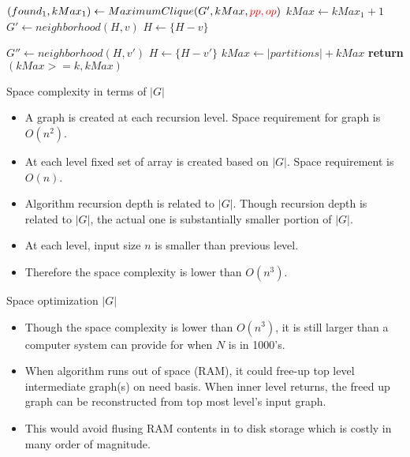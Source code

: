 \documentclass[landscape]{slides}
\begin{document}
\begin{algorithm}
	\begin{algorithmic}[1]
		\State $(found_1, kMax_1) \gets MaximumClique(G', kMax, {\color{red} pp, op})$
		\State $kMax \gets kMax_1 + 1$
		\EndIf
		\EndIf
		\EndIf
		\State
		\State $G' \gets neighborhood(H, v)$
		\State $H \gets \{H - v\}$
		
		\State $G'' \gets neighborhood(H, v')$
		\State $H \gets \{H - v'\}$
		\EndIf
		\EndFor
		\EndWhile
		\State $kMax \gets |partitions| + kMax$
		\State \textbf{return} $(kMax >= k, kMax)$
	\EndFunction
	\end{algorithmic}
\end{algorithm}

\clearpage


\begin{slide}
	\begin{center}
		Space complexity in terms of $|G|$
	\end{center}
	\begin{itemize}
		\setlength{\itemsep}{0pt}
		\setlength{\parskip}{20pt}
		\setlength{\parsep}{0pt}
		\item A graph is created at each recursion level. Space requirement for graph is $O(n^2)$. 
		\item At each level fixed set of array is created based on $|G|$. Space requirement is $O(n)$.
		\item Algorithm recursion depth is related to $|G|$. Though recursion depth is related to $|G|$, the actual one is substantially smaller portion of $|G|$.
		\item At each level, input size $n$ is smaller than previous level.
		\item Therefore the space complexity is lower than $O(n^3)$.
	\end{itemize}
\end{slide}


\begin{slide}
	\begin{center}
		Space optimization $|G|$
	\end{center}
	\begin{itemize}
		\setlength{\itemsep}{0pt}
		\setlength{\parskip}{20pt}
		\setlength{\parsep}{0pt}
		\item Though the space complexity is lower than $O(n^3)$, it is still larger than a computer system can provide for when $N$ is in 1000's.
		\item When algorithm runs out of space (RAM), it could free-up top level intermediate graph(s) on need basis. When inner level returns, the freed up graph can be reconstructed from top most level's input graph.
		\item This would avoid flusing RAM contents in to disk storage which is costly in many order of magnitude.
	\end{itemize}
\end{slide}
\end{document}
